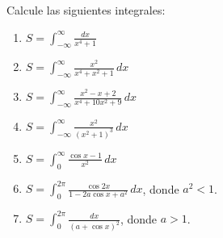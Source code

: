 \begin{exercise}
Calcule las siguientes integrales:
\begin{enumerate}[label=(\alph*)]
    \item $S = \displaystyle \int_{-\infty}^\infty \frac {dx} {x^4 + 1}$
    \item $S = \displaystyle \int_{-\infty}^\infty \frac {x^2} {x^4 + x^2 + 1} \, dx$
    \item $S = \displaystyle \int_{-\infty}^\infty \frac {x^2 - x + 2} {x^4 + 10x^2 + 9} \, dx$
    \item $S = \displaystyle \int_{-\infty}^\infty \frac {x^2} {(x^2 + 1)^3} \, dx$
    \item $S = \displaystyle \int_0^\infty \frac {\cos x - 1} {x^2} \, dx$
    \item $S = \displaystyle \int_0^{2\pi} \frac {\cos 2x} {1 - 2a \cos x + a^2} \, dx$, donde $a^2 < 1$.
    \item $S = \displaystyle \int_0^{2\pi} \frac {dx} {(a + \cos x)^2}$, donde $a > 1$.
\end{enumerate}
\end{exercise}


